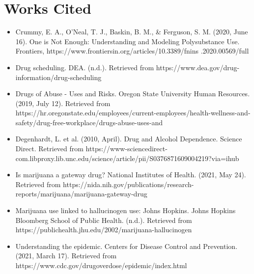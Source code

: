 \documentclass{article}
\begin{document}
\section{Works Cited}
\begin{itemize}
\setlength{\emergencystretch}{3em}
\item Crummy, E. A., O’Neal, T. J., Baskin, B. M., \& Ferguson, S. M. (2020, June 16). One is Not Enough: Understanding and Modeling Polysubstance Use. Frontiers, https://www.frontiersin.org/articles/10.3389/fnins .2020.00569/full

\item Drug scheduling. DEA. (n.d.). Retrieved from https://www.dea.gov/drug-information/drug-scheduling 

\item Drugs of Abuse - Uses and Risks. Oregon State University Human Resources. (2019, July 12). Retrieved from https://hr.oregonstate.edu/employees/current-employees/health-wellness-and-safety/drug-free-workplace/drugs-abuse-uses-and 

\item Degenhardt, L. et al. (2010, April). Drug and Alcohol Dependence. Science Direct. Retrieved from https://www-sciencedirect-com.libproxy.lib.unc.edu/science/article/pii/S0376871609004219?via=ihub 

\item Is marijuana a gateway drug? National Institutes of Health. (2021, May 24). Retrieved from https://nida.nih.gov/publications/research-reports/marijuana/marijuana-gateway-drug 

\item Marijuana use linked to hallucinogen use: Johns Hopkins. Johns Hopkins Bloomberg School of Public Health. (n.d.). Retrieved from https://publichealth.jhu.edu/2002/marijuana-hallucinogen 

\item Understanding the epidemic. Centers for Disease Control and Prevention. (2021, March 17). Retrieved from https://www.cdc.gov/drugoverdose/epidemic/index.html 
\end{itemize}
\end{document}
